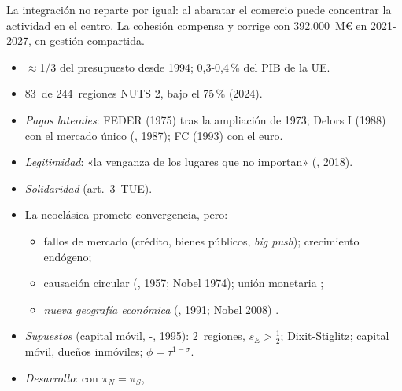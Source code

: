 \documentclass{article}
\begin{document}
\begin{columnas}
\begin{ideaclave}
La integración no reparte por igual: al abaratar el comercio puede concentrar la actividad en el centro. La cohesión compensa y corrige con 392.000~M€ en 2021-2027, en gestión compartida.
\end{ideaclave}

\begin{itemize}
\item $\approx$1/3 del presupuesto desde 1994; 0,3-0,4\,\% del PIB de la UE.
\item 83~de 244~regiones NUTS 2, bajo el 75\,\% (2024).
\end{itemize}
\begin{itemize}
\item \emph{Pagos laterales}: FEDER (1975) tras la ampliación de 1973; Delors I (1988) con el mercado único (, 1987); FC (1993) con el euro.
\item \emph{Legitimidad}: «la venganza de los lugares que no importan» (, 2018).
\item \emph{Solidaridad} (art.~3~TUE).
\end{itemize}
\begin{itemize}
\item La neoclásica promete convergencia, pero:
  \begin{itemize}
  \item fallos de mercado (crédito, bienes públicos, \emph{big push}); crecimiento endógeno;
  \item causación circular (, 1957; Nobel 1974); unión monetaria ;
  \item \emph{nueva geografía económica} (, 1991; Nobel 2008) .
  \end{itemize}
\end{itemize}
\begin{itemize}
\item \emph{Supuestos} (capital móvil, -, 1995): 2~regiones, $s_E>\frac12$; Dixit-Stiglitz; capital móvil, dueños inmóviles; $\phi=\tau^{1-\sigma}$.
\item \emph{Desarrollo}: con $\pi_N=\pi_S$,

\end{itemize}
\end{columnas}
\end{document}
